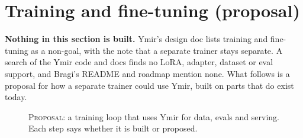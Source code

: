 \section{Training and fine-tuning (proposal)}\label{sec:training}

\begin{callout}
\textbf{Nothing in this section is built.} Ymir's design doc lists training and fine-tuning as a
non-goal, with the note that a separate trainer stays separate. A search of the Ymir code and docs
finds no LoRA, adapter, dataset or eval support, and Bragi's README and roadmap mention none. What
follows is a proposal for how a separate trainer could use Ymir, built on parts that do exist
today.
\end{callout}

\begin{figure}[htbp]
\centering
{}
\caption{\textsc{Proposal}: a training loop that uses Ymir for data, evals and serving. Each step
says whether it is built or proposed.}
\end{figure}

